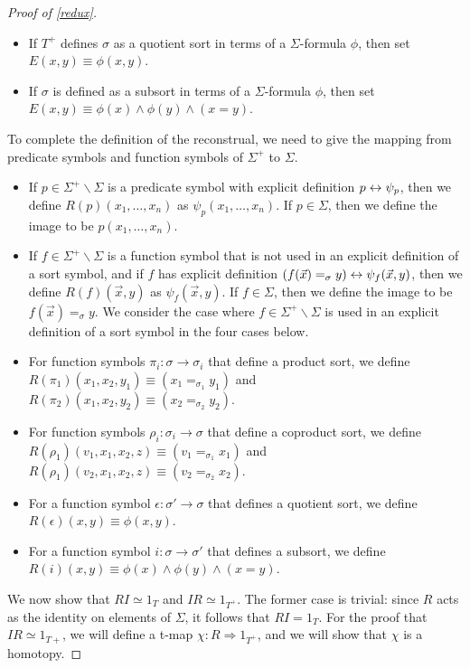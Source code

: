 \begin{proof}[Proof of \ref{redux}]
\begin{itemize}
\item If $T^+$ defines $\sigma$ as a quotient sort in terms of a
  $\Sigma$-formula $\phi$, then set $E(x,y)\equiv \phi (x,y)$.

\item If $\sigma$ is defined as a subsort in terms of a
  $\Sigma$-formula $\phi$, then set
  $E(x,y)\equiv \phi (x)\wedge \phi (y)\wedge (x=y)$.
\end{itemize}

\noindent To complete the definition of the reconstrual, we need to give the
mapping from predicate symbols and function symbols of $\Sigma ^+$ to
$\Sigma$.

\begin{itemize}
\item If $p\in\Sigma ^+\backslash\Sigma$ is a predicate symbol with
  explicit definition $p\leftrightarrow \psi _p$, then we define
  $R(p)(x_1,\dots ,x_n)$ as $\psi _p(x_1,\dots ,x_n)$.  If
  $p\in \Sigma$, then we define the image to be $p(x_1,\dots ,x_n)$.
\item If $f\in\Sigma ^+\backslash\Sigma$ is a function symbol that is
  not used in an explicit definition of a sort symbol, and if $f$ has
  explicit definition $(f(\vec{x})=_\sigma y)\leftrightarrow \psi _f(\vec{x},y)$,
  then we define $R(f)(\vec{x},y)$ as $\psi _f(\vec{x},y)$.  If
  $f\in\Sigma$, then we define the image to be $f(\vec{x})=_\sigma y$.
  We consider the case where $f\in\Sigma ^+\backslash\Sigma$ is used
  in an explicit definition of a sort symbol in the four cases below.
\item For function symbols $\pi _i:\sigma \to \sigma _i$ that define a
  product sort, we define
  $R(\pi _1)(x_1,x_2,y_1)\equiv (x_1=_{\sigma _1}y_1)$ and
  $R(\pi _2)(x_1,x_2,y_2)\equiv (x_2=_{\sigma _2}y_2)$.
\item For function symbols $\rho _i:\sigma _i\to\sigma$ that define a
  coproduct sort, we define
  $R(\rho _1)(v_1,x_1,x_2,z)\equiv (v_1=_{\sigma _1}x_1)$ and
  $R(\rho _1)(v_2,x_1,x_2,z)\equiv (v_2=_{\sigma _2}x_2)$.
\item For a function symbol $\epsilon :\sigma '\to \sigma$ that
  defines a quotient sort, we define
  $R(\epsilon )(x,y)\equiv \phi (x,y)$.
\item For a function symbol $i:\sigma\to\sigma '$ that defines a
  subsort, we define
  $R(i)(x,y) \equiv \phi (x)\wedge \phi (y)\wedge (x=y)$.
\end{itemize} 

We now show that $RI\simeq 1_T$ and $IR\simeq 1_{T^+}$.  The former
case is trivial: since $R$ acts as the identity on elements of
$\Sigma$, it follows that $RI=1_T$.  For the proof that
$IR\simeq 1_{T+}$, we will define a t-map
$\chi :R\Rightarrow 1_{T^+}$, and we will show that $\chi$ is a
homotopy.


\end{proof}

